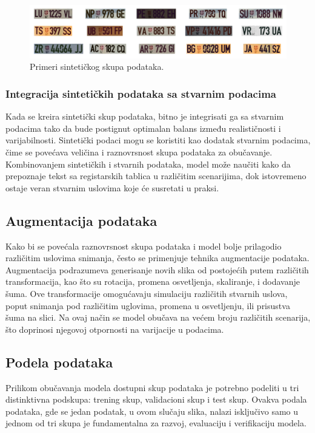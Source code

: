 \documentclass[a4paper,12pt]{article}
\begin{document}
	\begin{figure}[H]
		\centering
		\includegraphics[width=\textwidth]{assets/synthetic-license-plates.png}
		\caption{Primeri sintetičkog skupa podataka.}
		\label{fig:synthetic-license-plates}
	\end{figure}
	
	\subsubsection{Integracija sintetičkih podataka sa stvarnim podacima}
	Kada se kreira sintetički skup podataka, bitno je integrisati ga sa stvarnim podacima tako da bude postignut optimalan balans između realističnosti i varijabilnosti. Sintetički podaci mogu se koristiti kao dodatak stvarnim podacima, čime se povećava veličina i raznovrsnost skupa podataka za obučavanje. Kombinovanjem sintetičkih i stvarnih podataka, model može naučiti kako da prepoznaje tekst sa registarskih tablica u različitim scenarijima, dok istovremeno ostaje veran stvarnim uslovima koje će susretati u praksi.
	
	\subsection{Augmentacija podataka}
	Kako bi se povećala raznovrsnost skupa podataka i model bolje prilagodio različitim uslovima snimanja, često se primenjuje tehnika augmentacije podataka. Augmentacija podrazumeva generisanje novih slika od postojećih putem različitih transformacija, kao što su rotacija, promena osvetljenja, skaliranje, i dodavanje šuma. Ove transformacije omogućavaju simulaciju različitih stvarnih uslova, poput snimanja pod različitim uglovima, promena u osvetljenju, ili prisustva šuma na slici. Na ovaj način se model obučava na većem broju različitih scenarija, što doprinosi njegovoj otpornosti na varijacije u podacima.
	
	\subsection{Podela podataka}
	Prilikom obučavanja modela dostupni skup podataka je potrebno podeliti u tri distinktivna podskupa: trening skup, validacioni skup i test skup. Ovakva podala podataka, gde se jedan podatak, u ovom slučaju slika, nalazi isključivo samo u jednom od tri skupa je fundamentalna za razvoj, evaluaciju i verifikaciju modela.
	
\end{document}
